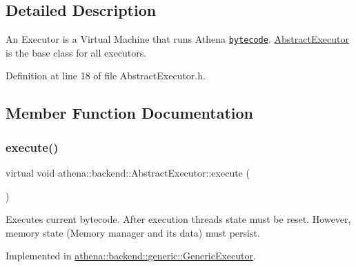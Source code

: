\subsection{Detailed Description}
An Executor is a Virtual Machine that runs Athena \href{https://athenaframework.ml/athena/bytecode/basics.html}{\tt bytecode}. \mbox{\hyperlink{classathena_1_1backend_1_1_abstract_executor}{Abstract\+Executor}} is the base class for all executors. 

Definition at line 18 of file Abstract\+Executor.\+h.



\subsection{Member Function Documentation}
\mbox{\label{classathena_1_1backend_1_1_abstract_executor_a5f179146ae76002b678a4862553f87ce}} 
\subsubsection{\texorpdfstring{execute()}{execute()}}
{\footnotesize\ttfamily virtual void athena\+::backend\+::\+Abstract\+Executor\+::execute (\begin{DoxyParamCaption}{ }\end{DoxyParamCaption})\hspace{0.3cm}{\ttfamily [pure virtual]}}

Executes current bytecode. After execution threads state must be reset. However, memory state (Memory manager and its data) must persist. 

Implemented in \mbox{\hyperlink{classathena_1_1backend_1_1generic_1_1_generic_executor_a38b56c284050d31198b28fcb6595bc73}{athena\+::backend\+::generic\+::\+Generic\+Executor}}.

\mbox{\label{classathena_1_1backend_1_1_abstract_executor_a6d61486e2a06500c9c0aa1e03a475e4a}} 
